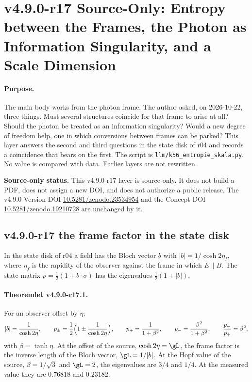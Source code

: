\clearpage
\section*{v4.9.0-r17 Source-Only: Entropy between the Frames, the Photon as Information Singularity, and a Scale Dimension}
\label{sec:v490-r17-entropy-scale}

\paragraph{Purpose.}
The main body works from the photon frame.  The author asked, on 2026-10-22, three things.  Must several structures coincide
for that frame to arise at all?  Should the photon be treated as an information singularity?  Would a new degree of freedom
help, one in which conversions between frames can be parked?  This layer answers the second and third questions in the state
disk of r04 and records a coincidence that bears on the first.  The script is \texttt{llm/k56\_entropie\_skala.py}.  No value
is compared with data.  Earlier layers are not rewritten.

\noindent\textbf{Source-only status.}
This v4.9.0-r17 layer is source-only.  It does not build a PDF, does not assign a new DOI,
and does not authorize a public release.  The v4.9.0 Version DOI
\href{https://doi.org/10.5281/zenodo.23534954}{10.5281/zenodo.23534954} and the Concept DOI
\href{https://doi.org/10.5281/zenodo.19210728}{10.5281/zenodo.19210728} are unchanged by it.

\subsection*{v4.9.0-r17 the frame factor in the state disk}
\label{subsec:v490-r17-frame-factor}

In the state disk of r04 a field has the Bloch vector \(b\) with \(|b|=1/\cosh2\eta_f\), where \(\eta_f\) is the rapidity of the
observer against the frame in which \(E\parallel B\).  The state matrix \(\rho=\tfrac12(1+b\cdot\sigma)\) has the eigenvalues
\(\tfrac12(1\pm|b|)\).

\paragraph{Theoremlet v4.9.0-r17.1.}
For an observer offset by \(\eta\):
\[
|b|=\frac1{\cosh2\eta},\qquad
p_\pm=\frac12\Bigl(1\pm\frac1{\cosh2\eta}\Bigr),\qquad
p_+=\frac1{1+\beta^2},\qquad p_-=\frac{\beta^2}{1+\beta^2},\qquad \frac{p_-}{p_+}=\beta^2,
\]
with \(\beta=\tanh\eta\).  At the offset of the source, \(\cosh2\eta=\gL\), the frame factor is the inverse length of the Bloch
vector, \(\gL=1/|b|\).  At the Hopf value of the source, \(\beta=1/\sqrt3\) and \(\gL=2\), the eigenvalues are \(3/4\) and \(1/4\).
At the measured value they are \(0.76818\) and \(0.23182\).

